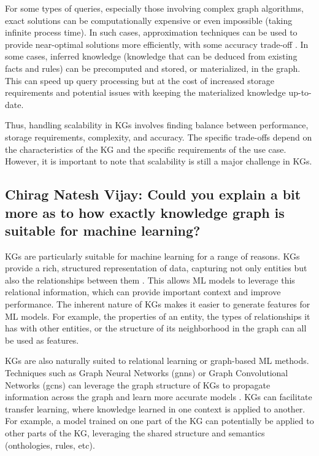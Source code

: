 \documentclass[11pt]{article} %
\begin{document}
For some types of queries, especially those involving complex graph algorithms, exact solutions can be computationally expensive or even impossible (taking infinite process time). In such cases, approximation techniques can be used to provide near-optimal solutions more efficiently, with some accuracy trade-off \cite{KG21}. In some cases, inferred knowledge (knowledge that can be deduced from existing facts and rules) can be precomputed and stored, or materialized, in the graph. This can speed up query processing but at the cost of increased storage requirements and potential issues with keeping the materialized knowledge up-to-date.

Thus, handling scalability in KGs involves finding balance between performance, storage requirements, complexity, and accuracy. The specific trade-offs depend on the characteristics of the KG and the specific requirements of the use case. However, it is important to note that scalability is still a major challenge in KGs.

\subsection{Chirag Natesh Vijay: Could you explain a bit more as to how exactly knowledge graph is suitable for machine learning?}

KGs are particularly suitable for machine learning for a range of reasons. KGs provide a rich, structured representation of data, capturing not only entities but also the relationships between them \cite*{KG21}. This allows ML models to leverage this relational information, which can provide important context and improve performance. The inherent nature of KGs makes it easier to generate features for ML models. For example, the properties of an entity, the types of relationships it has with other entities, or the structure of its neighborhood in the graph can all be used as features.

KGs are also naturally suited to relational learning or graph-based ML methods. Techniques such as Graph Neural Networks (\acrshort{gnn}s) or Graph Convolutional Networks (\acrshort{gcn}s) can leverage the graph structure of KGs to propagate information across the graph and learn more accurate models \cite*{KG21}. KGs can facilitate transfer learning, where knowledge learned in one context is applied to another. For example, a model trained on one part of the KG can potentially be applied to other parts of the KG, leveraging the shared structure and semantics (onthologies, rules, etc).
\end{document}
